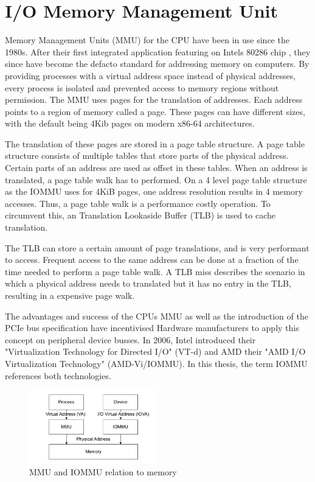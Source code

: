 \section{I/O Memory Management Unit}
Memory Management Units (MMU) for the CPU have been in use since the 1980s. After their first integrated application featuring on Intels 80286 chip \cite{intel80286}, they since have become the defacto standard for addressing memory on computers. By providing processes with a virtual address space instead of physical addresses, every process is isolated and prevented access to memory regions without permission. The MMU uses pages for the translation of addresses. Each address points to a region of memory called a page. These pages can have different sizes, with the default being 4Kib pages on modern x86-64 architectures.

The translation of these pages are stored in a page table structure. A page table structure consists of multiple tables that store parts of the physical address. Certain parts of an address are used as offset in these tables. When an address is translated, a page table walk has to performed. On a 4 level page table structure as the IOMMU uses for 4KiB pages, one address resolution results in 4 memory accesses. Thus, a page table walk is a performance costly operation. To circumvent this, an Translation Lookaside Buffer (TLB) is used to cache translation.

The TLB can store a certain amount of page translations, and is very performant to access. Frequent access to the same address can be done at a fraction of the time needed to perform a page table walk. A TLB miss describes the scenario in which a physical address needs to translated but it has no entry in the TLB, resulting in a expensive page walk.

The advantages and success of the CPUs MMU as well as the introduction of the PCIe bus specification have incentivised Hardware manufacturers to apply this concept on peripheral device busses. In 2006, Intel introduced their "Virtualization Technology for Directed I/O" (VT-d) and AMD their "AMD I/O Virtualization Technology" (AMD-Vi/IOMMU). In this thesis, the term IOMMU references both technologies.

\begin{figure}
    \centering
    \includegraphics[width=0.5\textwidth]{figures/MMUIOMMU.pdf}
    \caption{MMU and IOMMU relation to memory}
    \label{fig:mmuvsiommu}
\end{figure}

